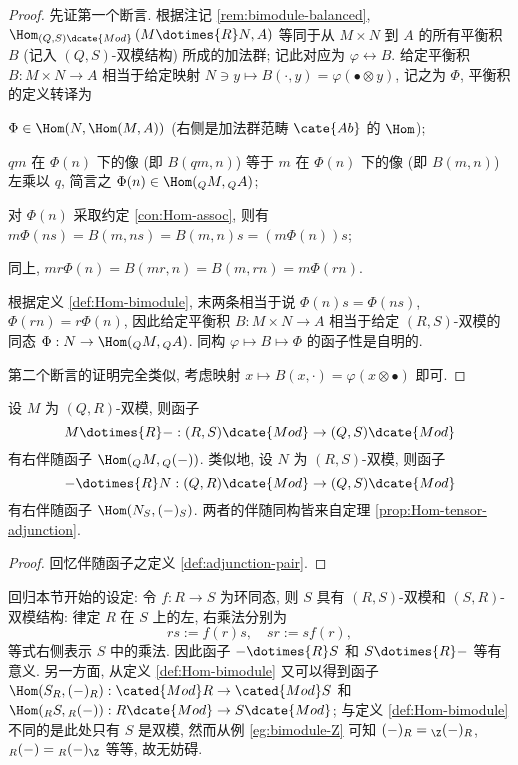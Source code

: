 \begin{proof}
	先证第一个断言. 根据注记 \ref{rem:bimodule-balanced}, $\Hom_{(Q,S)\dcate{Mod}} \left( M \dotimes{R} N, A \right)$ 等同于从 $M \times N$ 到 $A$ 的所有平衡积 $B$ (记入 $(Q, S)$-双模结构) 所成的加法群; 记此对应为 $\varphi \leftrightarrow B$. 给定平衡积 $B: M \times N \to A$ 相当于给定映射 $N \ni y \mapsto B(\cdot, y) = \varphi(\bullet \otimes y)$, 记之为 $\Phi$, 平衡积的定义转译为
	\begin{compactitem}
		\item $\Phi \in \Hom(N, \Hom(M, A))$ (右侧是加法群范畴 $\cate{Ab}$ 的 $\Hom$);
		\item $qm$ 在 $\Phi(n)$ 下的像 (即 $B(qm, n)$) 等于 $m$ 在 $\Phi(n)$ 下的像 (即 $B(m, n)$) 左乘以 $q$, 简言之 $\Phi(n) \in \Hom({}_Q M, {}_Q A)$;
		\item 对 $\Phi(n)$ 采取约定 \ref{con:Hom-assoc}, 则有 $ m \Phi(ns) = B(m, ns) = B(m, n)s = (m\Phi(n))s$;
		\item 同上, $mr \Phi(n) = B(mr, n) = B(m, rn) = m\Phi(rn)$.
	\end{compactitem}

	根据定义 \ref{def:Hom-bimodule}, 末两条相当于说 $\Phi(n)s = \Phi(ns)$, $\Phi(rn) = r\Phi(n)$, 因此给定平衡积 $B: M \times N \to A$ 相当于给定 $(R,S)$-双模的同态 $\Phi: N \to \Hom({}_Q M, {}_Q A)$. 同构 $\varphi \mapsto B \mapsto \Phi$ 的函子性是自明的.

	第二个断言的证明完全类似, 考虑映射 $x \mapsto B(x, \cdot) = \varphi(x \otimes \bullet)$ 即可.
\end{proof}

\begin{corollary}
	设 $M$ 为 $(Q, R)$-双模, 则函子
	\[ M \dotimes{R} -: (R, S)\dcate{Mod} \to (Q, S)\dcate{Mod} \]
	有右伴随函子 $\Hom({}_Q M, {}_Q (-))$. 类似地, 设 $N$ 为 $(R, S)$-双模, 则函子
	\[ - \dotimes{R} N: (Q, R)\dcate{Mod} \to (Q, S)\dcate{Mod} \]
	有右伴随函子 $\Hom(N_S, (-)_S)$. 两者的伴随同构皆来自定理 \ref{prop:Hom-tensor-adjunction}.
\end{corollary}
\begin{proof}
	回忆伴随函子之定义 \ref{def:adjunction-pair}.
\end{proof}

回归本节开始的设定: 令 $f: R \to S$ 为环同态, 则 $S$ 具有 $(R, S)$-双模和 $(S, R)$-双模结构: 律定 $R$ 在 $S$ 上的左, 右乘法分别为
\[ rs := f(r)s, \quad sr := sf(r), \]
等式右侧表示 $S$ 中的乘法. 因此函子 $- \dotimes{R} S$ 和 $S \dotimes{R} -$ 等有意义. 另一方面, 从定义 \ref{def:Hom-bimodule} 又可以得到函子 $\Hom(S_R, (-)_R): \cated{Mod}R \to \cated{Mod}S$ 和 $\Hom({}_R S, {}_R (-)): R\dcate{Mod} \to S\dcate{Mod}$; 与定义 \ref{def:Hom-bimodule} 不同的是此处只有 $S$ 是双模, 然而从例 \ref{eg:bimodule-Z} 可知 $(-)_R = {}_\Z (-)_R$, ${}_R (-) = {}_R (-)_\Z$ 等等, 故无妨碍.


